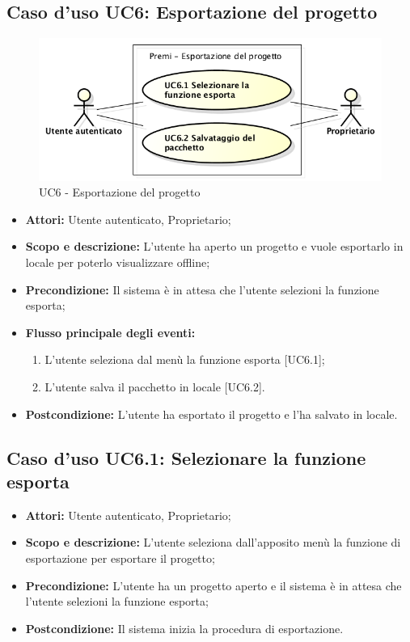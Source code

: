\subsection{Caso d'uso UC6: Esportazione del progetto}
	\begin{figure}[h]
		\centering
		\includegraphics[scale=0.45] {img/UC6.png}
		\caption{UC6 - Esportazione del progetto}
	\end{figure}

	\begin{itemize}
		\item \textbf{Attori:} Utente autenticato, Proprietario;
		\item \textbf{Scopo e descrizione:} L'utente ha aperto un progetto e vuole esportarlo in locale per poterlo visualizzare offline;
		\item \textbf{Precondizione:} Il sistema è in attesa che l'utente selezioni la funzione esporta;
		\item \textbf{Flusso principale degli eventi:}
		\begin{enumerate}
			\item L'utente seleziona dal menù la funzione esporta [UC6.1];
			\item L'utente salva il pacchetto in locale [UC6.2].
		\end{enumerate}
		\item \textbf{Postcondizione:} L'utente ha esportato il progetto e l'ha salvato in locale.
	\end{itemize}


\subsection{Caso d'uso UC6.1: Selezionare la funzione esporta}
	\begin{itemize}
		\item \textbf{Attori:} Utente autenticato, Proprietario;
		\item \textbf{Scopo e descrizione:} L'utente seleziona dall'apposito menù la funzione di esportazione per esportare il progetto;
		\item \textbf{Precondizione:} L'utente ha un progetto aperto e il sistema è in attesa che l'utente selezioni la funzione esporta;
		\item \textbf{Postcondizione:} Il sistema inizia la procedura di esportazione.
	\end{itemize}


